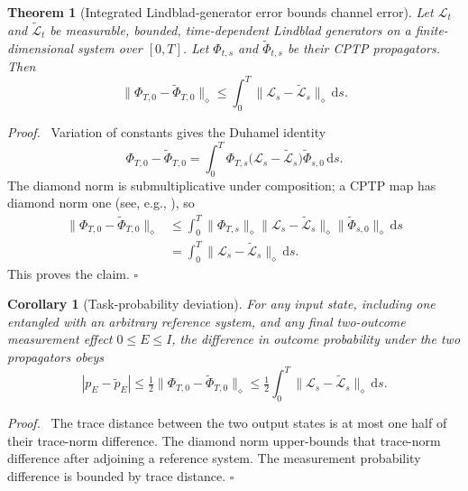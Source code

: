 \documentclass[10pt,twoside]{article}
\newtheorem{theorem}{Theorem}
\newtheorem{corollary}{Corollary}
\newenvironment{proof}{\par\noindent\textit{Proof.}\ }{\hfill$\square$\par}
\newcommand{\Lind}{\mathcal L}
\newcommand{\dd}{\,\mathrm d}
\begin{document}
\begin{theorem}[Integrated Lindblad-generator error bounds channel error]
\label{thm:duhamel}
Let $\Lind_t$ and $\widetilde{\Lind}_t$ be measurable, bounded, time-dependent Lindblad generators on a finite-dimensional system over $[0,T]$. Let $\Phi_{t,s}$ and $\widetilde\Phi_{t,s}$ be their CPTP propagators. Then
\begin{equation}
\|\Phi_{T,0}-\widetilde\Phi_{T,0}\|_\diamond
\leq\int_0^T\|\Lind_s-\widetilde{\Lind}_s\|_\diamond\dd s.
\label{eq:diamondbound}
\end{equation}
\end{theorem}

\begin{proof}
Variation of constants gives the Duhamel identity
\begin{equation}
\Phi_{T,0}-\widetilde\Phi_{T,0}
=\int_0^T\Phi_{T,s}\bigl(\Lind_s-\widetilde{\Lind}_s\bigr)
\widetilde\Phi_{s,0}\dd s.
\label{eq:duhamel}
\end{equation}
The diamond norm is submultiplicative under composition; a CPTP map has diamond norm one (see, e.g., \citealp{watrous2018theory}), so
\begin{align*}
\|\Phi_{T,0}-\widetilde\Phi_{T,0}\|_\diamond
&\leq\int_0^T\|\Phi_{T,s}\|_\diamond
\|\Lind_s-\widetilde{\Lind}_s\|_\diamond
\|\widetilde\Phi_{s,0}\|_\diamond\dd s\\
&=\int_0^T\|\Lind_s-\widetilde{\Lind}_s\|_\diamond\dd s.
\end{align*}
This proves the claim.
\end{proof}

\begin{corollary}[Task-probability deviation]
\label{cor:probability}
For any input state, including one entangled with an arbitrary reference system, and any final two-outcome measurement effect $0\leq E\leq I$, the difference in outcome probability under the two propagators obeys
\begin{equation}
|p_E-\widetilde p_E|\leq\tfrac12\|\Phi_{T,0}-\widetilde\Phi_{T,0}\|_\diamond
\leq\tfrac12\int_0^T\|\Lind_s-\widetilde{\Lind}_s\|_\diamond\dd s.
\end{equation}
\end{corollary}

\begin{proof}
The trace distance between the two output states is at most one half of their trace-norm difference. The diamond norm upper-bounds that trace-norm difference after adjoining a reference system. The measurement probability difference is bounded by trace distance.
\end{proof}
\end{document}
